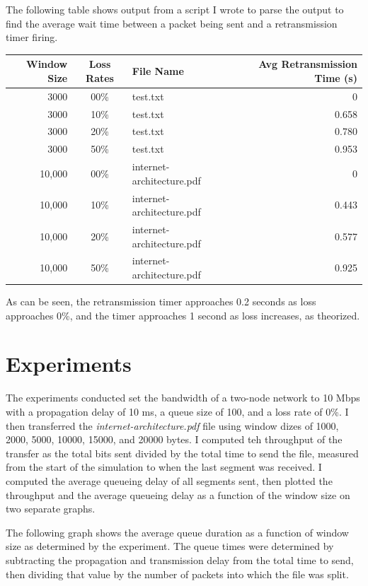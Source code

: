 \documentclass[11pt]{article}
\begin{document}
The following table shows output from a script I wrote to parse the output to find the average wait time between a packet being sent and a retransmission timer firing.

\vspace{0.5cm}
\begin{absolutelynopagebreak}
\begin{tabular}{rclr}
  \toprule
  Window Size & Loss Rates & File Name & Avg Retransmission Time (s)\\
  \midrule
  3000 & 00\% & test.txt & 0 \\
  3000 & 10\% & test.txt & 0.658 \\
  3000 & 20\% & test.txt & 0.780 \\
  3000 & 50\% & test.txt & 0.953 \\

  10,000 & 00\% & internet-architecture.pdf & 0 \\
  10,000 & 10\% & internet-architecture.pdf & 0.443 \\
  10,000 & 20\% & internet-architecture.pdf & 0.577 \\
  10,000 & 50\% & internet-architecture.pdf & 0.925 \\
  \bottomrule
\end{tabular}
\end{absolutelynopagebreak}
\vspace{0.5cm}

As can be seen, the retransmission timer approaches 0.2 seconds as loss approaches 0\%, and the timer approaches 1 second as loss increases, as theorized.

\section{Experiments}

The experiments conducted set the bandwidth of a two-node network to 10 Mbps with a propagation delay of 10 ms, a queue size of 100, and a loss rate of 0\%. I then transferred the \emph{internet-architecture.pdf} file using window dizes of 1000, 2000, 5000, 10000, 15000, and 20000 bytes. I computed teh throughput of the transfer as the total bits sent divided by the total time to send the file, measured from the start of the simulation to when the last segment was received. I computed the average queueing delay of all segments sent, then plotted the throughput and the average queueing delay as a function of the window size on two separate graphs.

The following graph shows the average queue duration as a function of window size as determined by the experiment. The queue times were determined by subtracting the propagation and transmission delay from the total time to send, then dividing that value by the number of packets into which the file was split.
\end{document}

